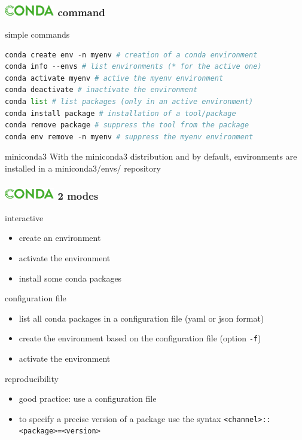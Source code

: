 \begin{frame}[containsverbatim]
\frametitle{\includegraphics[height=0.5cm]{shared/logo-conda.png} command}
\begin{block}{simple commands}
\begin{lstlisting}[language=python]
conda create env -n myenv # creation of a conda environment 
conda info --envs # list environments (* for the active one) 
conda activate myenv # active the myenv environment
conda deactivate # inactivate the environment
conda list # list packages (only in an active environment)
conda install package # installation of a tool/package
conda remove package # suppress the tool from the package
conda env remove -n myenv # suppress the myenv environment
\end{lstlisting}
\end{block}
\begin{block}{miniconda3}
With the miniconda3 distribution and by default, environments are installed in a miniconda3/envs/ repository
\end{block}
\end{frame}
\begin{frame}[containsverbatim]
\frametitle{\includegraphics[height=0.5cm]{shared/logo-conda.png} 2 modes}
\begin{block}{interactive}
\begin{itemize}
    \item create an environment
    \item activate the environment
    \item install some conda packages
\end{itemize}
\end{block}
\begin{block}{configuration file}
\begin{itemize}
    \item list all conda packages in a configuration file (yaml or json format)
    \item create the environment based on the configuration file (option \verb|-f|)
    \item activate the environment
\end{itemize}
\end{block}
\begin{block}{reproducibility}
\begin{itemize}
    \item good practice: use a configuration file
    \item to specify a precise version of a package use the syntax \verb|<channel>::<package>=<version>| 
\end{itemize}
\end{block}
\end{frame}